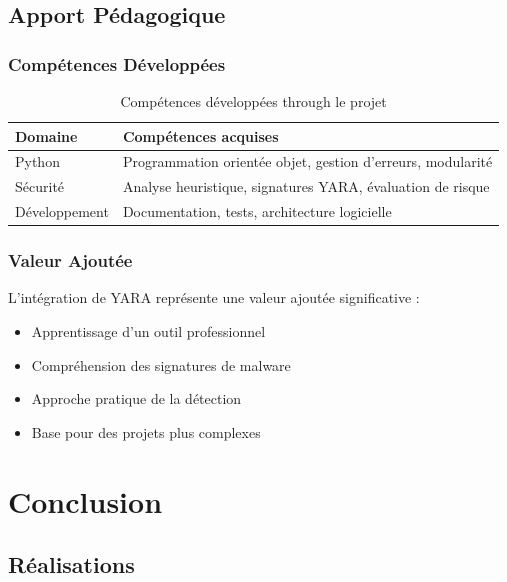 \documentclass[12pt,a4paper]{report}
\begin{document}
\section{Apport Pédagogique}

\subsection{Compétences Développées}

\begin{table}[h]
\centering
\begin{tabular}{|l|p{7cm}|}
\hline
\textbf{Domaine} & \textbf{Compétences acquises} \\
\hline
Python & Programmation orientée objet, gestion d'erreurs, modularité \\
Sécurité & Analyse heuristique, signatures YARA, évaluation de risque \\
Développement & Documentation, tests, architecture logicielle \\
\hline
\end{tabular}
\caption{Compétences développées through le projet}
\end{table}

\subsection{Valeur Ajoutée}

L'intégration de YARA représente une valeur ajoutée significative :
\begin{itemize}
    \item Apprentissage d'un outil professionnel
    \item Compréhension des signatures de malware
    \item Approche pratique de la détection
    \item Base pour des projets plus complexes
\end{itemize}

\chapter{Conclusion}

\section{Réalisations}
\end{document}

